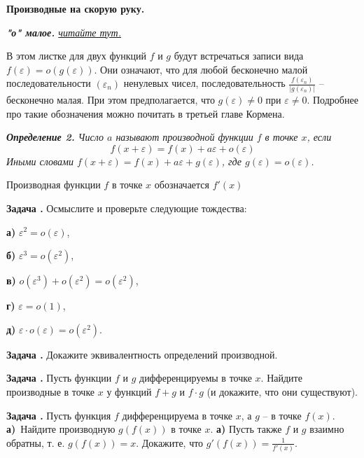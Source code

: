 \documentclass[12pt,a4paper]{article}
\newcounter{znum}
\newcommand{\z}[1]{\addtocounter{znum}{1} \textbf{Задача \arabic{znum}#1. }}
\begin{document}
\pagestyle{empty}

\begin{center} \Large \textbf{Производные на скорую руку.}
\end{center}

{\it {\bf "о" малое.} \href{https://ru.wikipedia.org/wiki/\%C2\%ABO\%C2\%BB\_\%D0\%B1\%D0\%BE\%D0\%BB\%D1\%8C\%D1\%88\%D0\%BE\%D0\%B5\_\%D0\%B8\_\%C2\%ABo\%C2\%BB\_\%D0\%BC\%D0\%B0\%D0\%BB\%D0\%BE\%D0\%B5}{читайте тут.}}



В этом листке для двух функций $f$ и $g$ будут встречаться записи вида $f(\varepsilon) = o(g(\varepsilon))$. Они означают, что для любой бесконечно малой последовательности $(\varepsilon_n)$ ненулевых чисел, последовательность $\frac{f(\varepsilon_n)}{|g(\varepsilon_n)|}$ -- бесконечно малая. При этом предполагается, что $g(\varepsilon) \ne 0$ при $\varepsilon \ne 0$.
Подробнее про такие обозначения можно почитать в третьей главе Кормена.

{\it {\bf Определение 2.} Число $a$ называют производной функции $f$ в точке $x$, если
$$f(x + \varepsilon) = f(x) + a \varepsilon + o(\varepsilon)$$
Иными словами $f(x + \varepsilon) = f(x) + a \varepsilon + g(\varepsilon)$, где $g(\varepsilon) = o(\varepsilon)$.}

Производная функции $f$ в точке $x$ обозначается $f'(x)$

\z{} Осмыслите и проверьте следующие тождества:\par
\textbf{а)} $\varepsilon^2 = o(\varepsilon)$,\par
\textbf{б)} $\varepsilon^3 = o(\varepsilon^2)$,\par
\textbf{в)} $o(\varepsilon^3) + o(\varepsilon^2) = o(\varepsilon^2)$,\par
\textbf{г)} $\varepsilon = o(1)$,\par
\textbf{д)} $\varepsilon \cdot o(\varepsilon) = o(\varepsilon^2)$.

\z{} Докажите эквивалентность определений производной.

\z{} Пусть функции $f$ и $g$ дифференцируемы в точке $x$. Найдите производные в точке $x$ у функций $f + g$ и $f \cdot g$ (и докажите, что они существуют).

\z{} Пусть функция $f$ дифференцируема в точке $x$, а $g$ -- в точке $f(x)$. \textbf{а)}~Найдите производную $g(f(x))$ в точке $x$. \textbf{а)} Пусть также $f$ и $g$ взаимно обратны, т. е. $g(f(x)) = x$. Докажите, что $g'(f(x)) = \frac{1}{f'(x)}$.
\end{document}
